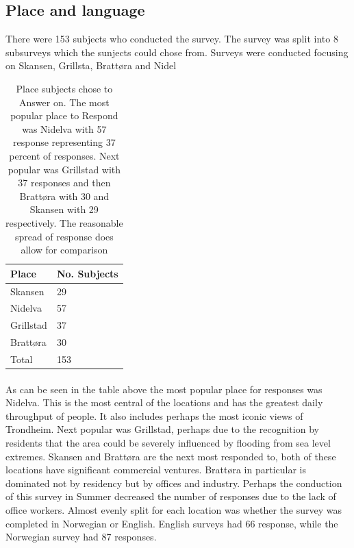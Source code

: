 \subsection{Place and language}
There were 153 subjects who conducted the survey. The survey was split into 8 subsurveys which the sunjects could chose from. Surveys were conducted focusing on Skansen, Grillsta, Brattøra and Nidel
\begin{table}[h]
    \centering
    \begin{tabular}{|l|l|}
    \hline
    Place  & No. Subjects  \\ \hline
      Skansen   & 29    \\ \hline
      Nidelva & 57      \\ \hline
      Grillstad & 37       \\ \hline
      Brattøra & 30     \\ \hline
      Total & 153   \\ \hline
     \end{tabular}
    \caption{Place subjects chose to Answer on. The most popular place to Respond was Nidelva with 57 response representing 37 percent of responses. Next popular was Grillstad with 37 responses and then Brattøra with 30 and Skansen with 29 respectively. The reasonable spread of response does allow for comparison}
    \label{tab:place}
\end{table}
\paragraph{}

As can be seen in the table above the most popular place for responses was Nidelva. This is the most central of the locations and has  the greatest daily throughput of people. It also includes perhaps the most iconic views of Trondheim. Next popular was Grillstad, perhaps due to the recognition by residents that the area could be severely influenced by flooding from sea level extremes. Skansen and Brattøra are the next most responded to, both of these locations have significant commercial ventures. Brattøra in particular is dominated not by residency but by offices and industry. Perhaps the conduction of this survey in Summer decreased the number of responses due to the lack of office workers. 
Almost evenly split for each location was whether the survey was completed in Norwegian or English. English surveys had 66 response, while the Norwegian survey had 87 responses.  

